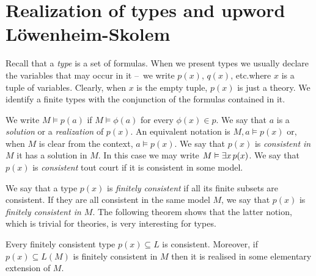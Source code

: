 \documentclass[creche.tex]{subfiles}
\begin{document}
% 
% 



\section{Realization of types and upword Löwenheim-Skolem}

\def\ceq#1#2#3{\parbox{13ex}{$\displaystyle #1$}\parbox{4ex}{\hfil$#2$}$\displaystyle #3$}
 
Recall that a \emph{type\/} is a set of formulas. When we present types we usually declare the variables that may occur in it --~we write \emph{$p(x)$}, \emph{$q(x)$}, etc.\@ where $x$ is a tuple of variables. Clearly, when $x$ is the empty tuple, $p(x)$ is just a theory. We identify a finite types with the conjunction of the formulas contained in it.

We write \emph{$M\models p(a)$} if $M\models\phi(a)$ for every $\phi(x)\in p$.  We say that $a$ is a \emph{solution\/} or a \emph{realization\/} of $p(x)$. An equivalent notation is \emph{$M,a\models p(x)$} or, when $M$ is clear from the context, \emph{$a\models p(x)$}. We say that $p(x)$ is \emph{consistent in $M$\/} it has a solution in $M$. In this case we may write \emph{$M\vDash\exists x\,p(x)$}.  We say that $p(x)$ is \emph{consistent\/} tout court if it is consistent in some model.

We say that a type $p(x)$ is \emph{finitely consistent\/} if all its finite subsets are consistent. If they are all consistent in the same model $M$, we say that $p(x)$ is \emph{finitely consistent in $M$}. The following theorem shows that the latter notion, which is trivial for theories, is very interesting for types.

\begin{void_thm}\label{thm_compattezzatipi}
Every finitely consistent type $p(x)\subseteq L$ is consistent. Moreover, if $p(x)\subseteq L(M)$ is finitely consistent in $M$ then it is realised in some elementary extension of $M$.
\end{void_thm}
\end{document}
